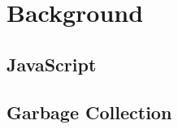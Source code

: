\documentclass[a4paper]{article}
\begin{document}



\section{Background}
\subsection{JavaScript}
\subsection{Garbage Collection}
\end{document}
